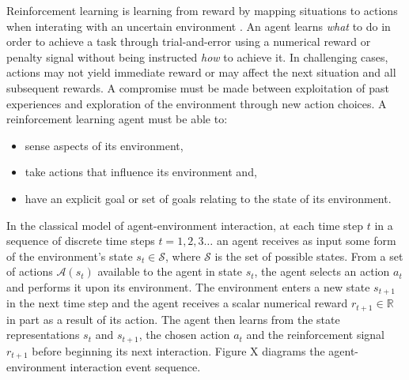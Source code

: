 Reinforcement learning is learning from reward by mapping situations to actions
when interating with an uncertain environment \cite{suttonbarto:1998}.  An
agent learns \textit{what} to do in order to achieve a task through
trial-and-error using a numerical reward or penalty signal without being
instructed \textit{how} to achieve it.  In challenging cases, actions may not
yield immediate reward or may affect the next situation and all subsequent
rewards.  A compromise must be made between exploitation of past experiences
and exploration of the environment through new action choices.  A
reinforcement learning agent must be able to:
\begin{itemize}
  \item sense aspects of its environment,
  \item take actions that influence its environment and,
  \item have an explicit goal or set of goals relating to the state of its
  environment.
\end{itemize}
In the classical model of agent-environment interaction, at each time step $t$
in a sequence of discrete time steps $t = 1,2,3\dotsc$ an agent receives as
input some form of the environment's state $s_t \in \mathscr{S}$, where
$\mathscr{S}$ is the set of possible states.  From a set of actions
$\mathscr{A}(s_t)$ available to the agent in state $s_t$, the agent selects an
action $a_t$ and performs it upon its environment.  The environment enters a
new state $s_{t+1}$ in the next time step and the agent receives a scalar
numerical reward $r_{t+1} \in \mathbb{R}$ in part as a result of its action.
The agent then learns from the state representations $s_t$ and $s_{t+1}$, the
chosen action $a_t$ and the reinforcement signal $r_{t+1}$ before beginning
its next interaction.  Figure X diagrams the agent-environment interaction
event sequence.

